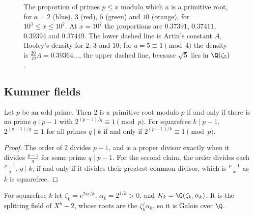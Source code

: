 \begin{figure}[ht]
\centering
{}
\caption{The proportion of primes $p\le x$ modulo which $a$ is a primitive root, for $a=2$ (blue), $3$ (red), $5$ (green) and $10$ (orange), for $10^3\le x\le10^7$. At $x=10^7$ the proportions are $0.37391$, $0.37411$, $0.39394$ and $0.37449$. The lower dashed line is Artin's constant $A$, Hooley's density for $2$, $3$ and $10$; for $a=5\equiv1\pmod4$ the density is $\frac{20}{19}A=0.39364\ldots$, the upper dashed line, because $\sqrt5$ lies in $\Q(\zeta_5)$.}
\label{fig:artin}
\end{figure}

\subsection*{Kummer fields}

\begin{lemma}\label{lem:primroot}
Let $p$ be an odd prime. Then $2$ is a primitive root modulo $p$ if and only if there is no prime $q\mid p-1$ with $2^{(p-1)/q}\equiv1\pmod p$. For squarefree $k\mid p-1$, $2^{(p-1)/q}\equiv1$ for all primes $q\mid k$ if and only if $2^{(p-1)/k}\equiv1\pmod p$.
\end{lemma}
\begin{proof}
The order of $2$ divides $p-1$, and is a proper divisor exactly when it divides $\frac{p-1}q$ for some prime $q\mid p-1$. For the second claim, the order divides each $\frac{p-1}q$, $q\mid k$, if and only if it divides their greatest common divisor, which is $\frac{p-1}k$ as $k$ is squarefree.
\end{proof}

For squarefree $k$ let $\zeta_k=e^{2i\pi/k}$, $\alpha_k=2^{1/k}>0$, and $K_k=\Q(\zeta_k,\alpha_k)$. It is the splitting field of $X^k-2$, whose roots are the $\zeta_k^j\alpha_k$, so it is Galois over $\Q$.

